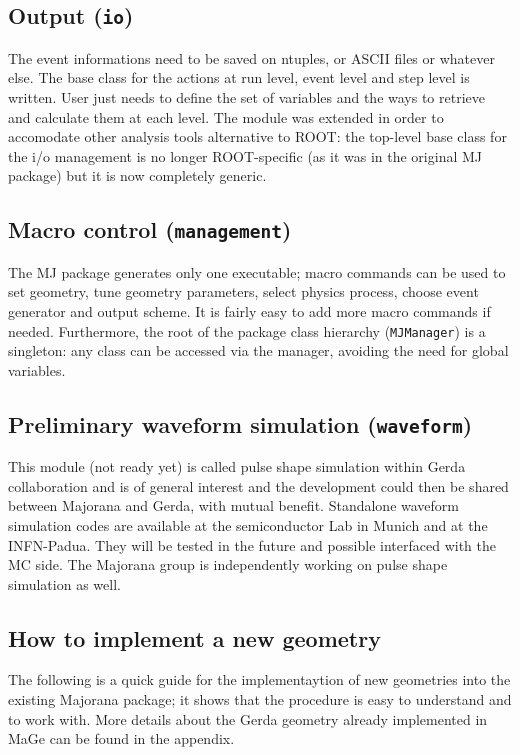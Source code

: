 \documentclass[a4paper,12pt,twoside]{article}
\begin{document}
\subsection{Output ({\tt io}) }

The event informations need to be saved on ntuples, or ASCII 
files or whatever else. The base class for the actions
at run level, event level and step level is written.
User just needs to define the set of variables and
the ways to retrieve and calculate them at each level. 
The module was extended in order to accomodate other 
analysis tools alternative to ROOT: the top-level 
base class for the i/o management is no longer ROOT-specific 
(as it was in the original MJ package) but it is now  
completely generic.

\subsection{Macro control ({\tt management})}
The MJ package generates only one executable;  
macro commands can be used to set geometry, tune geometry parameters,
select physics process, choose event generator and output scheme. 
It is fairly easy to add more macro commands if needed.
Furthermore, the root of the package class hierarchy ({\tt MJManager}) 
is a singleton: any class can be accessed via the 
manager, avoiding the need for global variables. 

\subsection{Preliminary waveform simulation ({\tt waveform})}
This module (not ready yet) is called pulse shape simulation
within Gerda collaboration 
and is of general interest and the 
development could then be shared between Majorana and Gerda, 
with mutual benefit.
Standalone waveform simulation codes are available at the
semiconductor Lab in Munich and at the INFN-Padua. They will be 
tested in the future and possible interfaced with the MC side.
The Majorana group is independently working on pulse shape 
simulation as well.


\subsection{How to implement a new geometry}
The following is a quick guide for the implementaytion of new geometries
into the existing Majorana package; it shows that the procedure is
easy to understand and to work with. 
More details about the Gerda geometry already implemented 
in MaGe can be found in the appendix.
\end{document}
